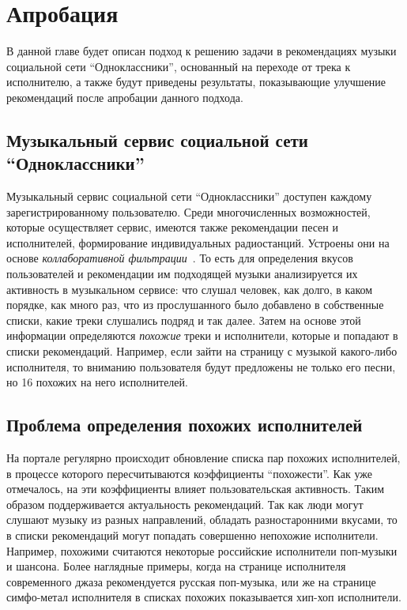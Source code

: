 \chapter{Апробация} 
\label{approbation}

В данной главе будет описан подход к решению задачи в рекомендациях музыки социальной сети ``Одноклассники'', основанный на переходе
от трека к исполнителю, а также будут приведены результаты, показывающие улучшение рекомендаций после апробации данного подхода.

\section{Музыкальный сервис социальной сети “Одноклассники”}

Музыкальный сервис социальной сети ``Одноклассники'' доступен каждому зарегистрированному пользователю. Среди многочисленных возможностей, 
которые осуществляет сервис, имеются также рекомендации песен и исполнителей, формирование индивидуальных радиостанций. Устроены они на 
основе \emph{коллаборативной фильтрации}~\cite{bugaychenko}. То есть для определения вкусов пользователей и рекомендации им подходящей музыки анализируется 
их активность в музыкальном сервисе: что слушал человек, как долго, в каком порядке, как много раз, что из прослушанного было добавлено 
в собственные списки, какие треки слушались подряд и так далее. Затем на основе этой информации определяются \emph{похожие} треки и исполнители,
которые и попадают в списки рекомендаций. Например, если зайти на страницу с музыкой какого-либо исполнителя, то вниманию пользователя будут 
предложены не только его песни, но 16 похожих на него исполнителей.

\section{Проблема определения похожих исполнителей}

На портале регулярно происходит обновление списка пар похожих исполнителей, в процессе которого пересчитываются коэффициенты ``похожести''.
Как уже отмечалось, на эти коэффициенты влияет пользовательская активность. Таким образом поддерживается актуальность рекомендаций.
Так как люди могут слушают музыку из разных направлений, обладать разностаронними вкусами, то в списки рекомендаций могут попадать совершенно
непохожие исполнители. Например, похожими считаются некоторые российские исполнители поп-музыки и шансона. 
Более наглядные примеры, когда на странице исполнителя современного джаза рекомендуется русская поп-музыка, или же 
на странице симфо-метал исполнителя в списках похожих показывается хип-хоп исполнители.

